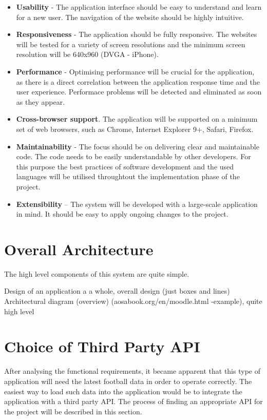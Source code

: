 \begin{itemize}
	\item \textbf{Usability} - The application interface should be easy to understand and learn for a new user. The navigation of the website should be highly intuitive.
	\item \textbf{Responsiveness} - The application should be fully responsive. The websites will be tested for a variety of screen resolutions and the minimum screen resolution will be 640x960 (DVGA - iPhone).
	\item \textbf{Performance} - Optimising performance will be crucial for the application, as there is a direct correlation between the application response time and the user experience.  Performace problems will be detected and eliminated as soon as they appear. 
	\item \textbf{Cross-browser support}. The application will be supported on a minimum set of web browsers, such as Chrome, Internet Explorer 9+, Safari, Firefox.
	\item \textbf{Maintainability} - The focus should be on delivering clear and maintainable code. The code needs to be easily understandable by other developers. For this purpose the best practices of software development and the used languages will be utilised throughtout the implementation phase of the project.
	\item \textbf{Extensibility} – The system will be developed with a large-scale application in mind. It should be easy to apply ongoing changes to the project.
\end{itemize}

\section{Overall Architecture}
\label{overallarchitecture_req}
The high level components of this system are quite simple. 

Design of an application a a whole, overall design (just boxes and lines)
Architectural diagram (overview) (aosabook.org/en/moodle.html -example), quite high level


\section{Choice of Third Party API}
\label{sec:thirdpartyapi_req}
	
	After analysing the functional requirements, it became apparent that this type of application will need the latest football data in order to operate correctly. The easiest way to load such data into the application would be to integrate the application with a third party API. The process of finding an appropriate API for the project will be described in this section. 
	
